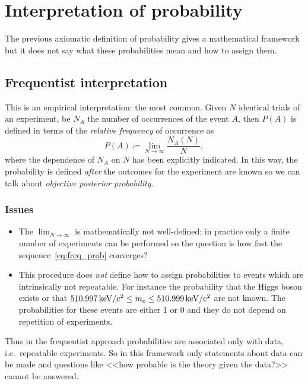 \documentclass[
	10pt,
	draft
]{scrreprt}
\begin{document}
	\section{Interpretation of probability}

The previous axiomatic definition of probability gives a mathematical framework but it does not say what these probabilities mean and how to assign them.

		\subsection{Frequentist interpretation}

This is an empirical interpretation: the most common.
Given $N$ identical trials of an experiment, be $N_A$ the number of occurrences of the event $A$, then $P(A)$ is defined in terms of the \emph{relative frequency} of occurrence as
\begin{equation}\label{eq:freq_prob}
P(A)\coloneqq \lim_{N\to\infty}\frac{N_A(N)}{N},
\end{equation}
where the dependence of $N_A$ on $N$ has been explicitly indicated.
In this way, the probability is defined \emph{after} the outcomes for the experiment are known so we can talk about \emph{objective posterior probability}.

			\subsubsection{Issues}

\begin{itemize}
	\item
The $\lim_{N\to\infty}$ is mathematically not well-defined: in practice only a finite number of experiments can be performed so the question is how fast the sequence~\eqref{eq:freq_prob} converges?
	\item
This procedure does \emph{not} define how to assign probabilities to events which are intrinsically not repeatable.
For instance the probability that the Higgs boson exists or that $\SI{510.997}{\kilo\electronvolt\per \ensuremath{c}\squared}\le m_e \le\SI{510.999}{\kilo\electronvolt\per \ensuremath{c}\squared}$ are not known.
The probabilities for these events are either \num{1} or \num{0} and they do not depend on  repetition of experiments.
\end{itemize}

Thus in the frequentist approach probabilities are associated only with data, i.e.~repeatable experiments.
So in this framework only statements about data can be made and questions like <<how probable is the theory given the data?>> cannot be answered.
\end{document}
